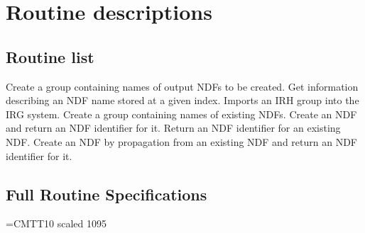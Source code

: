 \section {Routine descriptions}

\subsection {Routine list}

   {Create a group containing names of output NDFs to be created.}
   {Get information describing an NDF name stored at a given index.}
   {Imports an IRH group into the IRG system.}
   {Create a group containing names of existing NDFs.}
   {Create an NDF and return an NDF identifier for it.}
   {Return an NDF identifier for an existing NDF.}
   {Create an NDF by propagation from an existing NDF and return an NDF 
identifier for it.}

\subsection {Full Routine Specifications}
\label {SEC:FULLSPEC}
\newlength{\sstbannerlength}
\newlength{\sstcaptionlength}
\font\ssttt=CMTT10 scaled 1095
\newcommand{\sstroutine}[3]{
   \goodbreak
   \rule{\textwidth}{0.5mm}
   \vspace{-7ex}
   \newline
   \settowidth{\sstbannerlength}{{\Large {\bf #1}}}
   \setlength{\sstcaptionlength}{\textwidth}
   \addtolength{\sstbannerlength}{0.5em} 
   \addtolength{\sstcaptionlength}{-2.0\sstbannerlength}
   \addtolength{\sstcaptionlength}{-4.45pt}
   \parbox[t]{\sstbannerlength}{\flushleft{\Large {\bf #1}}}
   \parbox[t]{\sstcaptionlength}{\center{\Large #2}}
   \parbox[t]{\sstbannerlength}{\flushright{\Large {\bf #1}}}
   \begin{description}
      #3
   \end{description}
}

\newcommand{\sstdescription}[1]{\item[Description:] #1}

